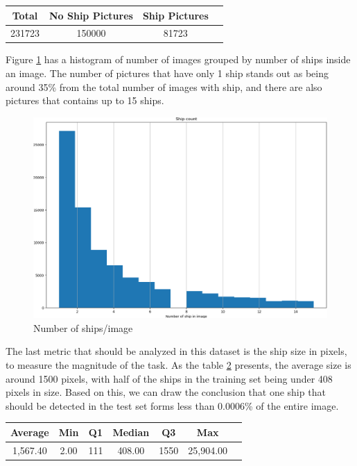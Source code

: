 \begin{table}[H]
	\centering
	\begin{tabular}{|c|c|c|l|}
		\hline
		Total & No Ship Pictures & Ship Pictures \\ \hline
		231723 & 150000 & 81723 \\ \hline
	\end{tabular}
	\label{shipnoshiptable}
\end{table}

Figure \ref{ShipNumberImage} has a histogram of number of images grouped by number of ships inside an image. The number of pictures that have only 1 ship stands out as being around 35\% from the total number of images with ship, and there are also pictures that contains up to 15 ships.

\begin{figure}
	\includegraphics[width=\textwidth]{Pictures/001ShipNumberImage.png}
	\caption{ Number of ships/image}
	\label{ShipNumberImage}
\end{figure}

The last metric that should be analyzed in this dataset is the ship size in pixels, to measure the magnitude of the task. As the table \ref{shipzisepixeltable} presents, the average size is around 1500 pixels, with half of the ships in the training set being under 408 pixels in size. Based on this, we can draw the conclusion that one ship that should be detected in the test set forms less than 0.0006\% of the entire image.

\begin{table}
	\centering
	\begin{tabular}{|c|c|c|c|c|c|l|}
		\hline
		Average & Min & Q1 & Median & Q3 & Max\\ \hline
		1,567.40 & 2.00	& 111 & 408.00 & 1550 & 25,904.00 \\ \hline
	\end{tabular}
	\label{shipzisepixeltable}
\end{table}

